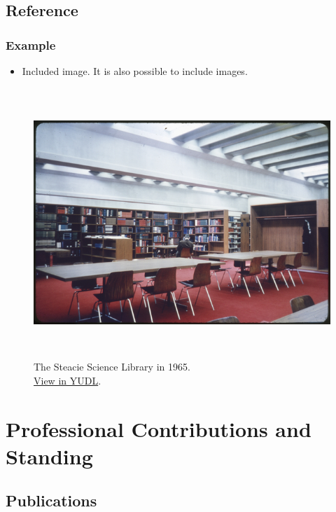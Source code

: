 \documentclass[12pt,oneside]{book}
\begin{document}
\section{Reference}

\subsection{Example}

\begin{itemize}
  \item Included image.  It is also possible to include images.
\end{itemize}

\begin{figure}[H]
  \includegraphics[height=4in]{images/yul 1121686_Medium_sized_JPEG.jpg}
  \caption{The Steacie Science Library in 1965. \\ \href{https://digital.library.yorku.ca/yul-1121686/steacie-science-library-interior-view}{View in YUDL}.}
\end{figure}

\newpage

\renewcommand\thechapter{B}
\chapter{Professional Contributions and Standing}

\section{Publications}
\end{document}
